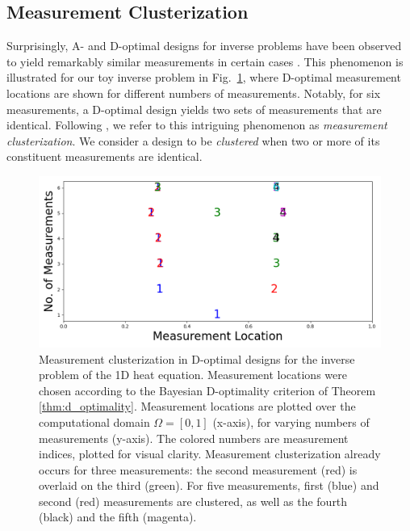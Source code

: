 \subsection{Measurement Clusterization}
Surprisingly, A- and D-optimal designs for inverse problems have been
observed to yield remarkably similar measurements in certain cases
\cite{fedorov1996, nyberg2012, fedorov1997, Ucinski05,
  neitzel2019sparse}. This phenomenon is illustrated for our toy
inverse problem in Fig.~\ref{fig:clusterization_illustration}, where
D-optimal measurement locations are shown for different numbers of
measurements. Notably, for six measurements, a D-optimal design yields
two sets of measurements that are identical. Following
\cite{Ucinski05}, we refer to this intriguing phenomenon as
\emph{measurement clusterization}. We consider a design to be
\emph{clustered} when two or more of its constituent measurements are
identical.

\begin{figure}
    \centering
    \includegraphics[height=0.5\textwidth]{figs/dst_modelError0.png}
    \caption{Measurement clusterization in D-optimal designs for the
      inverse problem of the 1D heat equation. Measurement locations
      were chosen according to the Bayesian D-optimality criterion of
      Theorem \ref{thm:d_optimality}. Measurement locations are
      plotted over the computational domain \(\Omega = [0, 1]\)
      (x-axis), for varying numbers of measurements (y-axis). The
      colored numbers are measurement indices, plotted for visual
      clarity. Measurement clusterization already occurs for three
      measurements: the second measurement (red) is overlaid on the
      third (green). For five measurements, first (blue) and second
      (red) measurements are clustered, as well as the fourth (black)
      and the fifth (magenta).}
  \label{fig:clusterization_illustration}
\end{figure}



